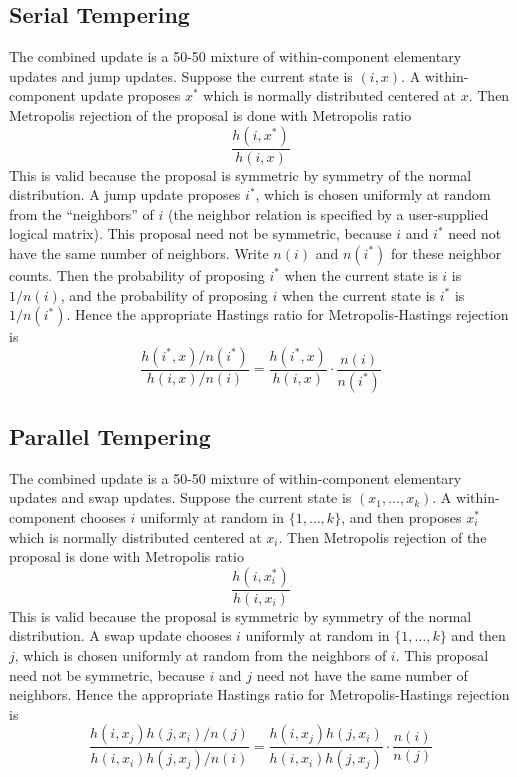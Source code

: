 \documentclass[11pt]{article}
\begin{document}
\subsection{Serial Tempering}

The combined update is a 50-50 mixture of within-component elementary updates
and jump updates.  Suppose the current state is $(i, x)$.  A within-component
update proposes $x^*$ which is normally distributed centered at $x$.  Then
Metropolis rejection of the proposal is done with Metropolis ratio
$$
   \frac{h(i, x^*)}{h(i, x)}
$$
This is valid because the proposal is symmetric by symmetry of the normal
distribution.  A jump update proposes $i^*$, which is chosen uniformly at
random from the ``neighbors'' of $i$ (the neighbor relation is specified
by a user-supplied logical matrix).  This proposal need not be symmetric,
because $i$ and $i^*$ need not have the same number of neighbors.  Write
$n(i)$ and $n(i^*)$ for these neighbor counts.  Then the probability of
proposing $i^*$ when the current state is $i$ is $1 / n(i)$, and the
probability of
proposing $i$ when the current state is $i^*$ is $1 / n(i^*)$.  Hence
the appropriate Hastings ratio for Metropolis-Hastings rejection is
$$
   \frac{h(i^*, x) / n(i^*)}{h(i, x) / n(i)}
   =
   \frac{h(i^*, x)}{h(i, x)} \cdot
   \frac{n(i)}{n(i^*)}
$$

\subsection{Parallel Tempering}

The combined update is a 50-50 mixture of within-component elementary updates
and swap updates.  Suppose the current state is $(x_1, \ldots, x_k)$.
A within-component chooses $i$ uniformly at random in $\{ 1, \ldots, k \}$,
and then proposes $x_i^*$ which is normally distributed centered at $x_i$.
Then Metropolis rejection of the proposal is done with Metropolis ratio
$$
   \frac{h(i, x_i^*)}{h(i, x_i)}
$$
This is valid because the proposal is symmetric by symmetry of the normal
distribution.  A swap update chooses $i$ uniformly at random in
$\{ 1, \ldots, k \}$ and then $j$, which is chosen uniformly at
random from the neighbors of $i$.
This proposal need not be symmetric,
because $i$ and $j$ need not have the same number of neighbors.
Hence the appropriate Hastings ratio for Metropolis-Hastings rejection is
$$
   \frac{h(i, x_j) h(j, x_i) / n(j)}{h(i, x_i) h(j, x_j) / n(i)}
   =
   \frac{h(i, x_j) h(j, x_i)}{h(i, x_i) h(j, x_j)} \cdot
   \frac{n(i)}{n(j)}
$$
\end{document}
